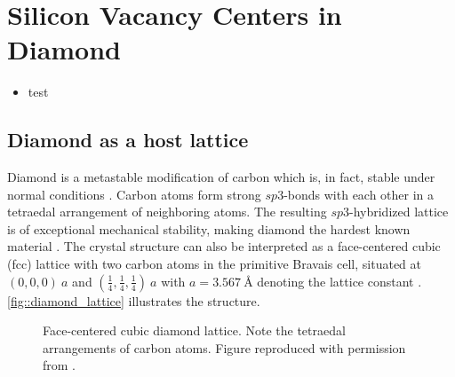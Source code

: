 
\chapter{Silicon Vacancy Centers in Diamond}	\label{ch::sivs}

\begin{remark}
    \begin{itemize}
      \item test
    \end{itemize}
\end{remark}

\section{Diamond as a host lattice}

  Diamond is a metastable modification of carbon which is, in fact, stable under normal conditions \cite{steinmetz::52}. Carbon atoms form strong $sp3$-bonds with each other in a tetraedal arrangement of neighboring atoms. The resulting $sp3$-hybridized lattice is of exceptional mechanical stability, making diamond the hardest known material \cite{?}. The crystal structure can also be interpreted as a face-centered cubic (fcc) lattice with two carbon atoms in the primitive Bravais cell, situated at $(0,0,0) \ a$ and $ (\frac{1}{4}, \frac{1}{4}, \frac{1}{4}) \ a$ with $a = \SI{3.567}{\angstrom}$ denoting the lattice constant \cite{steinmetz::56}. \autoref{fig::diamond_lattice} illustrates the structure.

  \begin{figure}[htbp]
		\centering
		\caption[Face-centered cubic diamond lattice]{Face-centered cubic diamond lattice. Note the tetraedal arrangements of carbon atoms. Figure reproduced with permission from \cite{janine::thesis}.}
		\label{fig::diamond_lattice}
	\end{figure}

